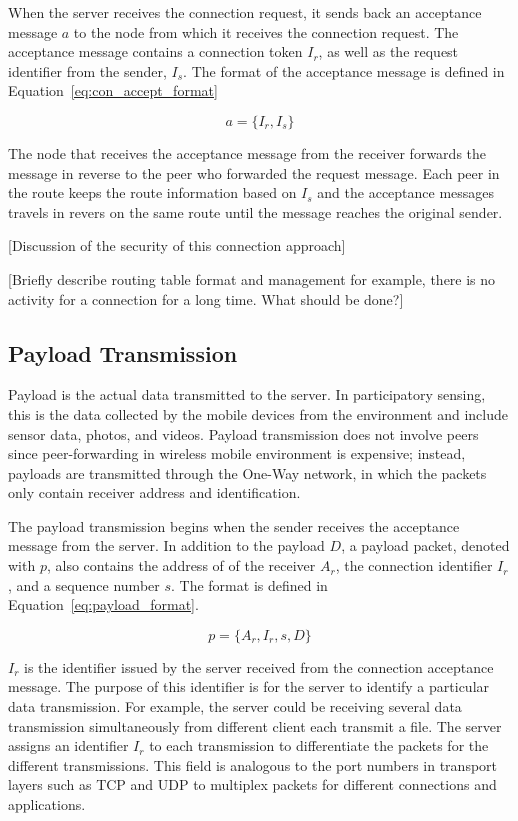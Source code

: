 When the server receives the connection request, it sends back an acceptance
message $a$ to the node from which it receives the connection request.
The acceptance message contains a connection token $I_r$, as well as the
request identifier from the sender, $I_s$. The format of the acceptance
message is defined in Equation~\ref{eq:con_accept_format}

\begin{equation}\label{eq:con_accept_format}
a = \{I_r, I_s\}
\end{equation}

The node that receives the acceptance message from the receiver forwards
the message in reverse to the peer who forwarded the request message.
Each peer in the route keeps the route information based on $I_s$ and
the acceptance messages travels in revers on the same route until the
message reaches the original sender.

[Discussion of the security of this connection approach]

[Briefly describe routing table format and management for example, there
is no activity for a connection for a long time. What should be done?]
\subsection{Payload Transmission}

Payload is the actual data transmitted to the server. In participatory
sensing, this is the data collected by the mobile devices from the
environment and include sensor data, photos, and videos. Payload
transmission does not involve peers since peer-forwarding in wireless
mobile environment is expensive; instead, payloads are transmitted
through the One-Way network, in which the packets only contain receiver
address and identification.

The payload transmission begins when the sender receives the acceptance
message from the server. In addition to the payload $D$, a payload
packet, denoted with $p$, also contains the address of of the receiver
$A_r$, the connection identifier $I_r$, and a sequence number $s$. The
format is defined in Equation~\ref{eq:payload_format}.

\begin{equation}\label{eq:payload_format}
p = \{A_r, I_r, s, D\}
\end{equation}

$I_r$ is the identifier issued by the server received from the connection
acceptance message. The purpose of this identifier is for the server to identify
a particular data transmission. For example, the server could be receiving
several data transmission simultaneously from different client each transmit
a file. The server assigns an identifier $I_r$ to each transmission to
differentiate the packets for the different transmissions. This field is
analogous to the port numbers in transport layers such as TCP and UDP to
multiplex packets for different connections and applications.

